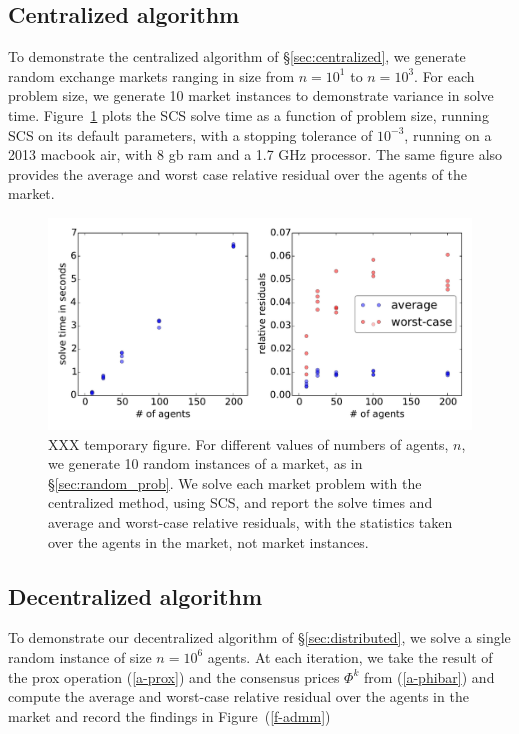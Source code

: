 \documentclass[12pt]{article}
\begin{document}
\subsection{Centralized algorithm}
To demonstrate the centralized algorithm of \S\ref{sec:centralized},
we generate random exchange markets ranging in size
from $n=10^1$ to $n=10^3$.
For each problem size, we generate 10 market instances to demonstrate
variance in solve time.
Figure~\ref{f-cvxpy}
plots the SCS solve time as a function of problem size, running
SCS on its default parameters, with a stopping tolerance of $10^{-3}$,
running on a 2013 macbook air, with 8 gb ram and a 1.7 GHz processor.
The same figure also provides the average and worst case relative residual over the agents of the market.


\begin{figure}
\begin{center}
\includegraphics[width=1.0\textwidth]{figures/cvxpy}
\end{center}
\caption{XXX temporary figure. For different values of numbers of agents, $n$,
we generate 10 random instances of a market, as in \S\ref{sec:random_prob}. We solve each market problem with the centralized method, using SCS, and report the solve times and average and worst-case relative residuals, with the statistics taken over the agents in the market, not market instances.}
\label{f-cvxpy}
\end{figure}


\subsection{Decentralized algorithm}
To demonstrate our decentralized algorithm of \S\ref{sec:distributed},
we solve a single random instance of size $n=10^6$ agents.
At each iteration, we take the result of the prox operation (\ref{a-prox}) and the consensus prices $\Phi^k$ from (\ref{a-phibar}) and compute
the average and worst-case relative residual over the agents in the market
and record the findings
in Figure~(\ref{f-admm}) %
\end{document}
